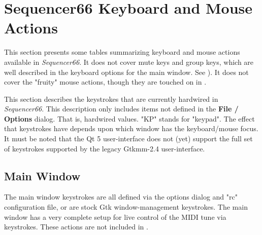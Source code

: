 %
%
%

\section{Sequencer66 Keyboard and Mouse Actions}
\label{sec:kbd_mouse_actions}

   This section presents some tables summarizing keyboard and mouse actions
   available in \textsl{Sequencer66}.
   It does not cover mute keys and group keys, which are well
   described in the keyboard options for the main window.
   See ).
   It does not cover the "fruity" mouse actions, though they are touched
   on in .


   This section describes the keystrokes that are currently hardwired
   in \textsl{Sequencer66}.
   This description only includes
   items not defined in the \textbf{File / Options}
   dialog.  That is, hardwired values.
   "KP" stands for "keypad".
   The effect that keystrokes have depends upon
   which window has the keyboard/mouse focus.
   It must be noted that the Qt 5 user-interface does not (yet) support the
   full set of keystrokes supported by the legacy Gtkmm-2.4 user-interface.

\subsection{Main Window}
\label{subsec:kbd_mouse_main_window}

   The main window keystrokes are all defined via the options dialog
   and "rc" configuration file, or are stock Gtk window-management keystrokes.
   The main window has a very complete setup for live control of the MIDI tune
   via keystrokes.  These actions are not included in
   .

